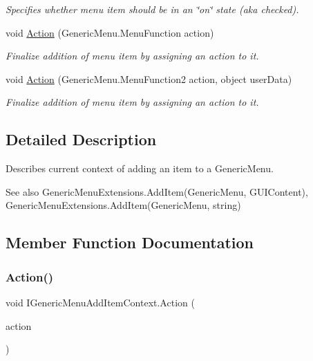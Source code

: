 \begin{DoxyCompactItemize}
\begin{DoxyCompactList}\small\item\em Specifies whether menu item should be in an \char`\"{}on\char`\"{} state (aka checked). \end{DoxyCompactList}\item 
void \hyperlink{interface_i_generic_menu_add_item_context_a7aa0dae2d629ef16b5fdf1244642b7ca}{Action} (Generic\+Menu.\+Menu\+Function action)
\begin{DoxyCompactList}\small\item\em Finalize addition of menu item by assigning an action to it. \end{DoxyCompactList}\item 
void \hyperlink{interface_i_generic_menu_add_item_context_ac880f540cc2f2cba3ec9f47a16f7742f}{Action} (Generic\+Menu.\+Menu\+Function2 action, object user\+Data)
\begin{DoxyCompactList}\small\item\em Finalize addition of menu item by assigning an action to it. \end{DoxyCompactList}\end{DoxyCompactItemize}


\subsection{Detailed Description}
Describes current context of adding an item to a Generic\+Menu. 

\begin{DoxySeeAlso}{See also}
Generic\+Menu\+Extensions.\+Add\+Item(\+Generic\+Menu, G\+U\+I\+Content), Generic\+Menu\+Extensions.\+Add\+Item(\+Generic\+Menu, string)


\end{DoxySeeAlso}


\subsection{Member Function Documentation}
\mbox{\label{interface_i_generic_menu_add_item_context_a7aa0dae2d629ef16b5fdf1244642b7ca}} 
\subsubsection{\texorpdfstring{Action()}{Action()}\hspace{0.1cm}{\footnotesize\ttfamily [1/2]}}
{\footnotesize\ttfamily void I\+Generic\+Menu\+Add\+Item\+Context.\+Action (\begin{DoxyParamCaption}\item[{Generic\+Menu.\+Menu\+Function}]{action }\end{DoxyParamCaption})}



